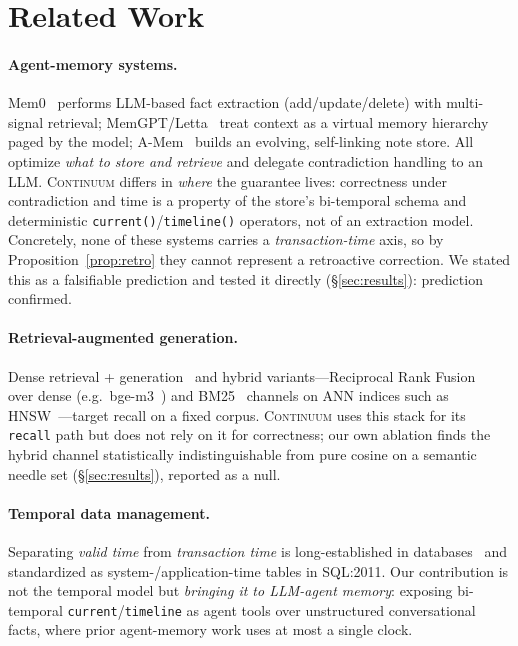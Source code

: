 \documentclass[11pt]{article}
\newcommand{\code}[1]{\texttt{#1}}
\begin{document}
\section{Related Work}

\paragraph{Agent-memory systems.} Mem0~\cite{mem0} performs LLM-based fact extraction
(add/update/delete) with multi-signal retrieval; MemGPT/Letta~\cite{memgpt} treat context as a
virtual memory hierarchy paged by the model; A-Mem~\cite{amem} builds an evolving, self-linking
note store. All optimize \emph{what to store and retrieve} and delegate contradiction handling to
an LLM. \textsc{Continuum} differs in \emph{where} the guarantee lives: correctness under
contradiction and time is a property of the store's bi-temporal schema and deterministic
\code{current()}/\code{timeline()} operators, not of an extraction model. Concretely, none of these
systems carries a \emph{transaction-time} axis, so by Proposition~\ref{prop:retro} they cannot
represent a retroactive correction. We stated this as a falsifiable prediction and tested it
directly (\S\ref{sec:results}): prediction confirmed.

\paragraph{Retrieval-augmented generation.} Dense retrieval + generation~\cite{rag} and hybrid
variants---Reciprocal Rank Fusion~\cite{rrf} over dense (e.g.\ bge-m3~\cite{bgem3}) and
BM25~\cite{bm25} channels on ANN indices such as HNSW~\cite{hnsw}---target recall on a fixed
corpus. \textsc{Continuum} uses this stack for its \code{recall} path but does not rely on it for
correctness; our own ablation finds the hybrid channel statistically indistinguishable from pure
cosine on a semantic needle set (\S\ref{sec:results}), reported as a null.

\paragraph{Temporal data management.} Separating \emph{valid time} from \emph{transaction time} is
long-established in databases~\cite{snodgrass} and standardized as system-/application-time tables
in SQL:2011. Our contribution is not the temporal model but \emph{bringing it to LLM-agent memory}:
exposing bi-temporal \code{current}/\code{timeline} as agent tools over unstructured conversational
facts, where prior agent-memory work uses at most a single clock.
\end{document}
